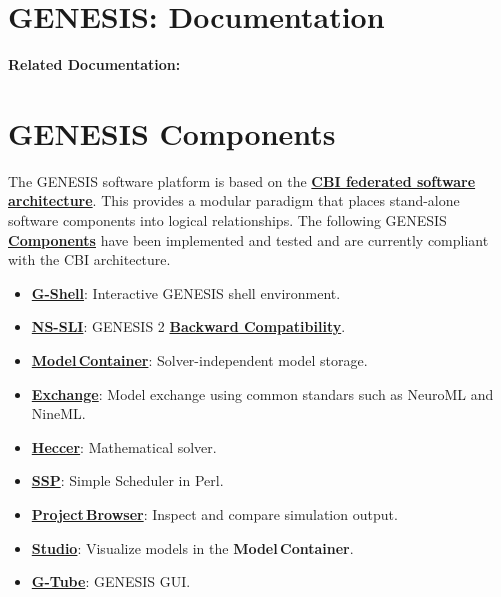 \documentclass[12pt]{article}
\begin{document}
\section*{GENESIS: Documentation}

{\bf Related Documentation:}

\section*{GENESIS Components}

The GENESIS software platform is based on the \href{../genesis-overview/genesis-overview.tex}{\bf CBI federated software architecture}. This provides a modular paradigm that places stand-alone software components into logical relationships. The following GENESIS \href{../reserved-words/reserved-words.tex}{\bf Components} have been implemented and tested and are currently compliant with the CBI architecture.

\begin{itemize}
   \item[]\href{../gshell/gshell.tex}{\bf G-Shell}: Interactive GENESIS shell environment.
   \item[]\href{../nssli/nssli.tex}{\bf NS-SLI}: GENESIS 2 \href{../backward-compatibility/backward-compatibility.tex}{\bf Backward Compatibility}.
   \item[]\href{../model-container/model-container.tex}{\bf Model\,Container}: Solver-independent model storage.
   \item[]\href{../exchange/exchange.tex}{\bf Exchange}: Model exchange using common standars such as NeuroML and NineML.
   \item[]\href{../heccer/heccer.tex}{\bf Heccer}: Mathematical solver.
   \item[]\href{../ssp/ssp.tex}{\bf SSP}: Simple Scheduler in Perl.
   \item[]\href{../project-browser/project-browser.tex}{\bf Project\,Browser}: Inspect and compare simulation output.
   \item[]\href{../studio/studio.tex}{\bf Studio}: Visualize models in the {\bf Model\,Container}.
   \item[]\href{../gtube/gtube.tex}{\bf G-Tube}: GENESIS GUI.
\end{itemize}
\end{document}
